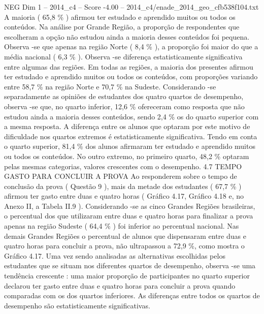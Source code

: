 \begin{textsample}{NEG Dim 1 – 2014\_c4 – Score -4.00 – 2014\_c4/enade\_2014\_geo\_cfb538f104.txt}
A maioria ( 65,8 \% ) afirmou ter estudado e aprendido muitos ou todos os conteúdos.
Na análise por Grande Região, a proporção de respondentes que escolheram a opção não estudou ainda a maioria desses conteúdos foi pequena.
Observa -se que apenas na região Norte ( 8,4 \% ), a proporção foi maior do que a média nacional ( 6,3 \% ).
Observa -se diferença estatisticamente significativa entre algumas das regiões.
Em todas as regiões, a maioria dos presentes afirmou ter estudado e aprendido muitos ou todos os conteúdos, com proporções variando entre 58,7 \% na região Norte e 70,7 \% na Sudeste.
Considerando -se separadamente as opiniões de estudantes dos quatro quartos de desempenho, observa -se que, no quarto inferior, 12,6 \% ofereceram como resposta que não estudou ainda a maioria desses conteúdos, sendo 2,4 \% os do quarto superior com a mesma resposta.
A diferença entre os alunos que optaram por este motivo de dificuldade nos quartos extremos é estatisticamente significativa.
Tendo em conta o quarto superior, 81,4 \% dos alunos afirmaram ter estudado e aprendido muitos ou todos os conteúdos.
No outro extremo, no primeiro quarto, 48,2 \% optaram pelas mesmas categorias, valores crescentes com o desempenho. 4.7 TEMPO GASTO PARA CONCLUIR A PROVA Ao responderem sobre o tempo de conclusão da prova ( Questão 9 ), mais da metade dos estudantes ( 67,7 \% ) afirmou ter gasto entre duas e quatro horas ( Gráfico 4.17, Gráfico 4.18 e, no Anexo II, a Tabela II.9 ).
Considerando -se as cinco Grandes Regiões brasileiras, o percentual dos que utilizaram entre duas e quatro horas para finalizar a prova apenas na região Sudeste ( 64,4 \% ) foi inferior ao percentual nacional.
Nas demais Grandes Regiões o percentual de alunos que dispensaram entre duas e quatro horas para concluir a prova, não ultrapassou a 72,9 \%, como mostra o Gráfico 4.17.
Uma vez sendo analisadas as alternativas escolhidas pelos estudantes que se situam nos diferentes quartos de desempenho, observa -se uma tendência crescente : uma maior proporção de participantes no quarto superior declarou ter gasto entre duas e quatro horas para concluir a prova quando comparadas com os dos quartos inferiores.
As diferenças entre todos os quartos de desempenho são estatisticamente significativas.

\end{textsample}
